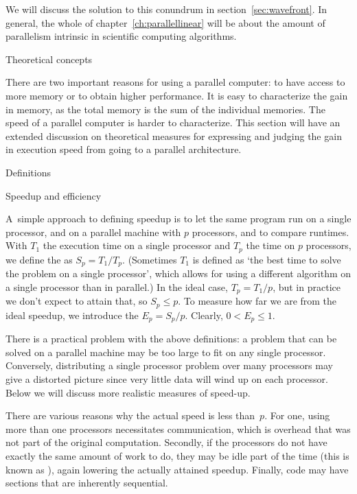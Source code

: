 We will discuss the solution to this conundrum in
section~\ref{sec:wavefront}. In general, the whole of
chapter~\ref{ch:parallellinear} will be about the amount of
parallelism intrinsic in scientific computing algorithms.

 {Theoretical concepts}
\label{sec:speedup-efficiency}

There are two important reasons for using a parallel computer: to have
access to more memory or to obtain higher performance. It is easy to
characterize the gain in memory, as the total memory is the sum of the
individual memories. The speed of a parallel computer is harder to
characterize. This section will have an extended discussion on
theoretical measures for expressing and judging the gain in execution
speed from going to a parallel architecture.

 {Definitions}
\label{sec:speedup}

 {Speedup and efficiency}

A~simple approach to defining speedup is to let the same program run on a
single processor, and on a parallel machine with $p$ processors, and
to compare runtimes.
With $T_1$ the execution time on a single processor and
$T_p$ the time on $p$ processors, we define the  as
$S_p=T_1/T_p$. (Sometimes $T_1$ is defined as `the best time to solve the
problem on a single processor', which allows for using a different
algorithm on a single processor than in parallel.)
In the ideal case, $T_p=T_1/p$, but in practice we don't expect to
attain that, so $S_p\leq p$. To measure how far we are from the ideal
speedup, we introduce the  $E_p=S_p/p$. Clearly,
$0< E_p\leq 1$.

There is a practical problem with
the above definitions: a problem that can be solved on a parallel machine
may be too large to fit on any single processor. Conversely,
distributing a single processor problem
over many processors may give a distorted picture since very little
data will wind up on each processor. Below we will discuss more
realistic measures of speed-up.

There are various reasons why the actual speed is less than~$p$. For
one, using more than one processors necessitates communication, which
is overhead that was not part of the original computation. Secondly,
if the processors do not have exactly the same amount of work to do,
they may be idle part of the time (this is known as
), again lowering the actually attained
speedup. Finally, code may have sections that are inherently
sequential.


